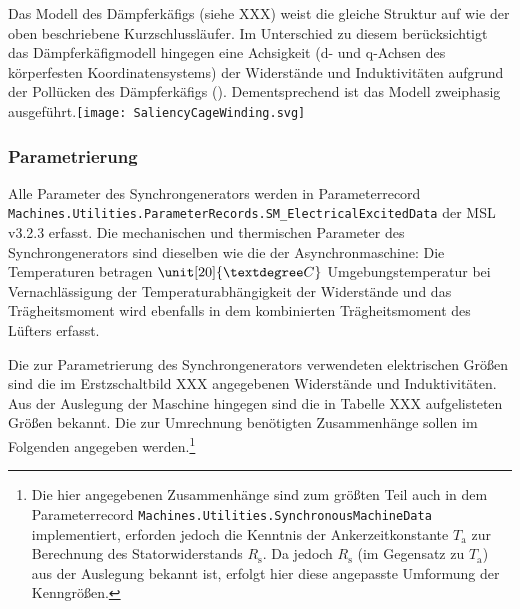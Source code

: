 Das Modell des Dämpferkäfigs (siehe XXX) weist die gleiche Struktur auf
wie der oben beschriebene Kurzschlussläufer. Im Unterschied zu diesem
berücksichtigt das Dämpferkäfigmodell hingegen eine Achsigkeit (d- und
q-Achsen des körperfesten Koordinatensystems) der Widerstände und
Induktivitäten aufgrund der Pollücken des Dämpferkäfigs
(\cite[S. 194]{kralModelicaObjektorientierteModellbildung2019}).
Dementsprechend ist das Modell zweiphasig
ausgeführt.\texttt{[image: SaliencyCageWinding.svg]}

\hypertarget{parametrierung-1}{%
\subsubsection{Parametrierung}\label{parametrierung-1}}

Alle Parameter des Synchrongenerators werden in Parameterrecord
\texttt{Machines.Utilities.ParameterRecords.SM\_ElectricalExcitedData}
der MSL v3.2.3 erfasst. Die mechanischen und thermischen Parameter des
Synchrongenerators sind dieselben wie die der Asynchronmaschine: Die
Temperaturen betragen \(\unit[20]{°C}\) Umgebungstemperatur bei
Vernachlässigung der Temperaturabhängigkeit der Widerstände und das
Trägheitsmoment wird ebenfalls in dem kombinierten Trägheitsmoment des
Lüfters erfasst.

Die zur Parametrierung des Synchrongenerators verwendeten elektrischen
Größen sind die im Erstzschaltbild XXX angegebenen Widerstände und
Induktivitäten. Aus der Auslegung der Maschine hingegen sind die in
Tabelle XXX aufgelisteten Größen bekannt. Die zur Umrechnung benötigten
Zusammenhänge sollen im Folgenden angegeben werden.\footnote{Die hier
  angegebenen Zusammenhänge sind zum größten Teil auch in dem
  Parameterrecord \texttt{Machines.Utilities.SynchronousMachineData}
  implementiert, erforden jedoch die Kenntnis der Ankerzeitkonstante
  \(T_{\mathrm{a}}\) zur Berechnung des Statorwiderstands
  \(R_{\mathrm{s}}\). Da jedoch \(R_{\mathrm{s}}\) (im Gegensatz zu
  \(T_{\mathrm{a}}\)) aus der Auslegung bekannt ist, erfolgt hier diese
  angepasste Umformung der Kenngrößen.}

